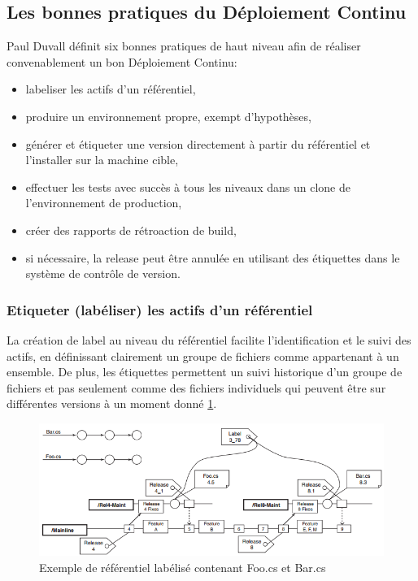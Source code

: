     \subsection{Les bonnes pratiques du Déploiement Continu}
    Paul Duvall définit six bonnes pratiques de haut niveau afin de réaliser convenablement un bon Déploiement Continu:\\
    \begin{itemize}
      \item labeliser les actifs d'un référentiel,
      \item produire un environnement propre, exempt d'hypothèses,
      \item générer et étiqueter une version directement à partir du référentiel et l'installer sur la machine cible,
      \item effectuer les tests avec succès à tous les niveaux dans un clone de l'environnement de production,
      \item créer des rapports de rétroaction de build,
      \item	si nécessaire, la release peut être annulée en utilisant des étiquettes dans le système de contrôle de version.\\
    \end{itemize}

      \subsubsection{Etiqueter (labéliser) les actifs d’un référentiel}
      La création de label au niveau du référentiel facilite l'identification et le suivi des actifs, en définissant clairement un groupe de fichiers comme appartenant à un ensemble. De plus, les étiquettes permettent un suivi historique d'un groupe de fichiers et pas seulement comme des fichiers individuels qui peuvent être sur différentes versions à un moment donné \ref{Labels Referential}.

      \begin{figure}
        \begin{center}
          \includegraphics[scale=0.7]{images/Labels.png}
        \end{center}
        \caption{Exemple de référentiel labélisé contenant Foo.cs et Bar.cs}
        \label{Labels Referential}
      \end{figure}

